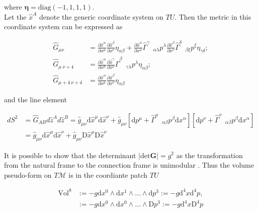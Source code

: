 \documentclass[11pt,a4paper,headinclude=true,DIV=14,BCOR=8mm,chapterprefix,listof=totoc,twoside,openright,abstracton]{scrbook}
\begin{document}
where $\boldsymbol{\eta} = \text{diag}(-1, 1, 1, 1)$. \\
Let the $\hat{x}^A$ denote the generic coordinate system on $TU$. Then the metric in this coordinate system can be expressed as

\begin{align}
    \hat{G}_{\mu\nu} &= \frac{\partial \hat{x}^{\alpha}}{\partial x^{\mu}}\frac{\partial \hat{x}^{\beta}}{\partial x^{\nu}}\eta_{\alpha\beta} + \frac{\partial \hat{x}^{\alpha}}{\partial x^{\mu}}{\hat{\Gamma}^{\gamma}}_{\:\:\:\alpha\lambda}p^{\lambda}\frac{\partial \hat{x}^{\beta}}{\partial x^{\nu}}{\hat{\Gamma}^{\delta}}_{\:\:\:\beta\xi}p^{\xi}\eta_{\gamma\delta}; \\
    \hat{G}_{\mu\: \nu+4} &= \frac{\partial \hat{x}^{\alpha}}{\partial x^{\mu}}\frac{\partial \hat{x}^{\gamma}}{\partial x^{\nu}}{\hat{\Gamma}^{\beta}}_{\:\:\:\gamma\lambda}p^{\lambda}\eta_{\alpha\beta}; \\
    \hat{G}_{\mu+4 \: \nu+4} &= \frac{\partial \hat{x}^{\alpha}}{\partial x^{\mu}}\frac{\partial \hat{x}^{\beta}}{\partial x^{\nu}} \eta_{\alpha\beta}
\end{align}

and the line element 

\begin{align}
    dS^2 &= \hat{G}_{AB}d\hat{z}^A d\hat{z}^B = \hat{g}_{\mu\nu}\text{d}\hat{x}^{\mu}\text{d}\hat{x}^{\nu} + \hat{g}_{\mu\nu}[\text{d}p^{\mu} + {\hat{\Gamma}^{\mu}}_{\:\:\:\alpha\beta}p^{\beta}\text{d}x^{\alpha}] [\text{d}p^{\nu} + {\hat{\Gamma}^{\nu}}_{\:\:\:\alpha\beta}p^{\beta}\text{d}x^{\alpha}] \\
    &= \hat{g}_{\mu\nu}\text{d}\hat{x}^{\mu}\text{d}\hat{x}^{\nu} + \hat{g}_{\mu\nu}\text{D}\hat{x}^{\mu}\text{D}\hat{x}^{\nu}
\end{align}

It is possible to show that the determinant $|\text{det}\boldsymbol{G}| = g^{2}$ as the transformation from the natural frame to the connection frame is unimodular \cite{Lindquist:1966}. Thus the volume pseudo-form on $T\mathcal{M}$ is in the coordiante patch $TU$

\begin{align}
    \text{Vol}^8 &:= -g \text{d}x^{0} \wedge \text{d}x^{1} \wedge ... \wedge \text{d}p^{3} := - g\text{d}^{4}x \text{d}^{4}p, \\
    &:= -g \text{d}x^{0} \wedge \text{d}x^{0} \wedge ... \wedge \text{D}p^{3} :=-g \text{d}^{4}x\text{D}^4 p
\end{align}
\end{document}
